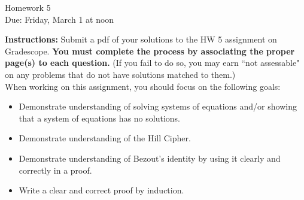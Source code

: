 \documentclass[12pt]{article}
\begin{document}
\begin{center}
{\Large Homework 5}\\
Due: Friday,  March 1 at noon\\


\end{center}
{\bf Instructions:} Submit a pdf of your solutions to the HW 5 assignment on Gradescope.  {\bf You must complete the process by associating the proper page(s) to each question.} (If you fail to do so, you may earn ``not assessable" on any problems that do not have solutions matched to them.)\\[3pt]

\noindent When working on this assignment, you should focus on the following goals:
\begin{itemize}
\item Demonstrate understanding of solving systems of equations and/or showing that a system of equations has no solutions.
\item Demonstrate understanding of the Hill Cipher. 
\item Demonstrate understanding of Bezout's identity by using it clearly and correctly in a proof. 
\item Write a clear and correct proof by induction. 
\end{itemize}
\end{document}
